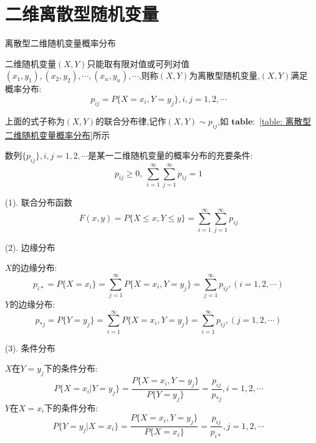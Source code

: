 \section{二维离散型随机变量}
\begin{table}[ht]
	\centering
	\caption{离散型二维随机变量概率分布}
	\label{table: 离散型二维随机变量概率分布}
\end{table}
\begin{definition}[二维离散型随机变量]
	
	二维随机变量$(X,Y)$只能取有限对值或可列对值$(x_{1},y_{1}),(x_{2},y_{2}),\cdots,(x_{n},y_{n}),\cdots$,则称$(X,Y)$为离散型随机变量,$(X,Y)$满足概率分布: 
	$$p_{ij}=P\{X=x_{i},Y=y_{j}\},i,j=1,2,\cdots$$
	
	上面的式子称为$(X,Y)$的联合分布律,记作$(X,Y)\sim p_{ij}$,如 $\mathbf{table: }$ \ref{table: 离散型二维随机变量概率分布}所示
	
	$\text{数列}\{p_{ij}\},i,j=1,2,\cdots\text{是某一二维随机变量的概率分布的充要条件: }$
	$$ p_{ij}\geq 0,\ \sum\limits_{i=1}^{\infty}\sum\limits_{j=1}^{\infty}p_{ij}=1$$
	
	
	(1). 联合分布函数
	$$F(x,y)=P\{X\leq x,Y\leq y\}=\sum\limits_{i=1}^{\infty}\sum\limits_{j=1}^{\infty}p_{ij}$$
	
	(2). 边缘分布
	
	$X$的边缘分布: 
	$$p_{i*}=P\{X=x_{i}\}=\sum\limits_{j=1}^{\infty}P\{X=x_{i},Y=y_{j}\}=\sum\limits_{j=1}^{\infty}p_{ij},(i=1,2,\cdots)$$
	$Y$的边缘分布: 
	$$p_{*j}=P\{Y=y_{j}\}=\sum\limits_{i=1}^{\infty}P\{X=x_{i},Y=y_{j}\}=\sum\limits_{i=1}^{\infty}p_{ij},(j=1,2,\cdots)$$
	
	(3). 条件分布
	
	$X$在$Y=y_{j}$下的条件分布: 
	$$P\{X=x_{i}|Y=y_{j}\}=\dfrac{P\{X=x_{i},Y=y_{j}\}}{P\{Y=y_{j}\}}=\dfrac{p_{ij}}{p_{*j}},i=1,2,\cdots$$
	$Y$在$X=x_{i}$下的条件分布: 
	$$P\{Y=y_{j}|X=x_{i}\}=\dfrac{P\{X=x_{i},Y=y_{j}\}}{P\{X=x_{i}\}}=\dfrac{p_{ij}}{p_{i*}},j=1,2,\cdots$$
\end{definition}
